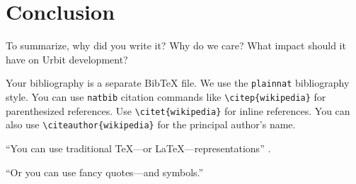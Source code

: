 \documentclass[twoside]{article}
\begin{document}
%
%
%
%
%
%
%
%
%
%
%
%

%
%
\section{Conclusion}

To summarize, why did you write it?  Why do we care?  What impact should it have on Urbit development?

Your bibliography is a separate BibTeX file.  We use the \texttt{plainnat} bibliography style.  You can use \texttt{natbib} citation commands like \texttt{\textbackslash citep\{wikipedia\}} for parenthesized references.  Use \texttt{\textbackslash citet\{wikipedia\}} for inline references.  You can also use \texttt{\textbackslash citeauthor\{wikipedia\}} for the principal author's name.

``You can use traditional TeX---or LaTeX---representations'' \citep{Varney1987}.

“Or you can use fancy quotes—and symbols.”



\end{document}

